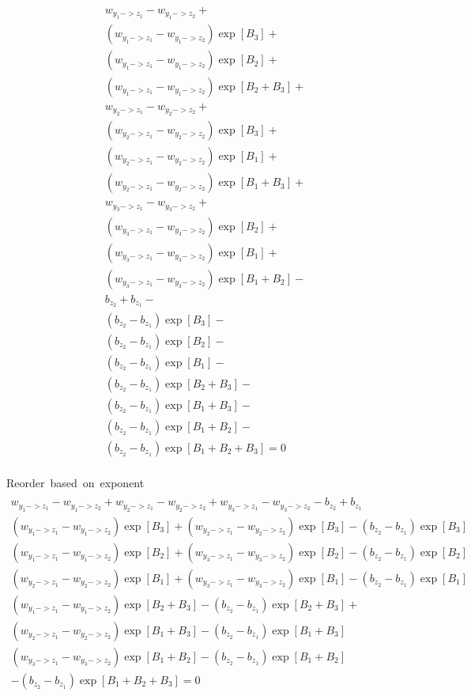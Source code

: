 \documentclass{article}
\begin{document}
\begin{multline}
    w_{y_1->z_1} - w_{y_1->z_2} +\\
    (w_{y_1->z_1} - w_{y_1->z_2})\exp[B_3] + \\
    (w_{y_1->z_1} - w_{y_1->z_2})\exp[B_2] + \\
    (w_{y_1->z_1} - w_{y_1->z_2})\exp[B_2+B_3]  +\\ 
    w_{y_2->z_1} - w_{y_2->z_2} + \\
    (w_{y_2->z_1} - w_{y_2->z_2})\exp[B_3] +\\
    (w_{y_2->z_1} - w_{y_2->z_2})\exp[B_1] +\\
    (w_{y_2->z_1} - w_{y_2->z_2})\exp[B_1+B_3] +\\
    w_{y_3->z_1} - w_{y_3->z_2} +\\
    (w_{y_3->z_1} - w_{y_3->z_2})\exp[B_2] +\\
    (w_{y_3->z_1} - w_{y_3->z_2})\exp[B_1] +\\
    (w_{y_3->z_1} - w_{y_3->z_2})\exp[B_1+B_2] -\\
    b_{z_2} + b_{z_1} -\\
    (b_{z_2} - b_{z_1})\exp[B_3] -\\
    (b_{z_2} - b_{z_1})\exp[B_2] -\\
    (b_{z_2} - b_{z_1})\exp[B_1] -\\
    (b_{z_2} - b_{z_1})\exp[B_2+B_3] -\\
    (b_{z_2} - b_{z_1})\exp[B_1+B_3] -\\
    (b_{z_2} - b_{z_1})\exp[B_1+B_2] -\\
    (b_{z_2} - b_{z_1})\exp[B_1+B_2+B_3] = 0\\
\end{multline}

\hbox{Reorder based on exponent}
\begin{multline}\\
    w_{y_1->z_1} - w_{y_1->z_2} +
    w_{y_2->z_1} - w_{y_2->z_2} +
    w_{y_3->z_1} - w_{y_3->z_2} 
    - b_{z_2} + b_{z_1} \\
    (w_{y_1->z_1} - w_{y_1->z_2})\exp[B_3] + 
    (w_{y_2->z_1} - w_{y_2->z_2})\exp[B_3]  
    - (b_{z_2} - b_{z_1})\exp[B_3] \\
    (w_{y_1->z_1} - w_{y_1->z_2})\exp[B_2] + 
    (w_{y_3->z_1} - w_{y_3->z_2})\exp[B_2] 
    - (b_{z_2} - b_{z_1})\exp[B_2] \\
    (w_{y_2->z_1} - w_{y_2->z_2})\exp[B_1] +
    (w_{y_3->z_1} - w_{y_3->z_2})\exp[B_1]
    - (b_{z_2} - b_{z_1})\exp[B_1] \\
    (w_{y_1->z_1} - w_{y_1->z_2})\exp[B_2+B_3] -
    (b_{z_2} - b_{z_1})\exp[B_2+B_3] +\\ 
    (w_{y_2->z_1} - w_{y_2->z_2})\exp[B_1+B_3]
    - (b_{z_2} - b_{z_1})\exp[B_1+B_3] \\
    (w_{y_3->z_1} - w_{y_3->z_2})\exp[B_1+B_2]
    - (b_{z_2} - b_{z_1})\exp[B_1+B_2] \\
    - (b_{z_2} - b_{z_1})\exp[B_1+B_2+B_3] = 0\\
\end{multline}
\end{document}
